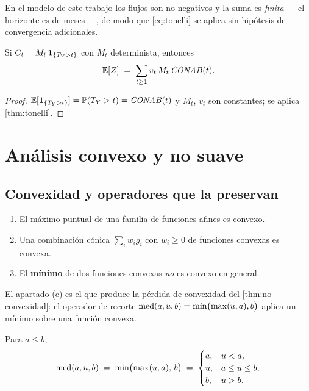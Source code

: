 En el modelo de este trabajo los flujos son no negativos y la suma es
\emph{finita} --- el horizonte es de \datoNMeses{} meses ---, de modo que
\cref{eq:tonelli} se aplica sin hipótesis de convergencia adicionales.

\begin{corollary}
\label{cor:vp-renta}
Si $C_t=M_t\,\mathbf{1}_{\{T_Y>t\}}$ con $M_t$ determinista, entonces
\[
  \mathbb{E}[Z]\;=\;\sum_{t\ge1}v_t\,M_t\,\mathit{CONAB}(t).
\]
\end{corollary}
\begin{proof}
$\mathbb{E}[\mathbf{1}_{\{T_Y>t\}}]=\mathbb{P}(T_Y>t)=\mathit{CONAB}(t)$ y $M_t$, $v_t$ son constantes;
se aplica \cref{thm:tonelli}.
\end{proof}

\section{Análisis convexo y no suave}
\label{sec:nosuave}

\subsection{Convexidad y operadores que la preservan}

\begin{lemma}
\label{lem:preserva-convexidad}
\begin{enumerate}[label=(\alph*),nosep]
  \item El máximo puntual de una familia de funciones afines es convexo.
  \item Una combinación cónica $\sum_i w_ig_i$ con $w_i\ge0$ de funciones convexas
        es convexa.
  \item El \textbf{mínimo} de dos funciones convexas \emph{no} es convexo en
        general.
\end{enumerate}
\end{lemma}

El apartado (c) es el que produce la pérdida de convexidad del
\cref{thm:no-convexidad}: el operador de recorte
$\operatorname{med}(a,u,b)=\min\bigl(\max(u,a),b\bigr)$ aplica un mínimo sobre una función
convexa.

\begin{definition}
Para $a\le b$,
\[
  \operatorname{med}(a,u,b)\;=\;\min\bigl(\max(u,a),\,b\bigr)
  \;=\;\begin{cases} a, & u<a,\\ u, & a\le u\le b,\\ b, & u>b.\end{cases}
\]
\end{definition}

